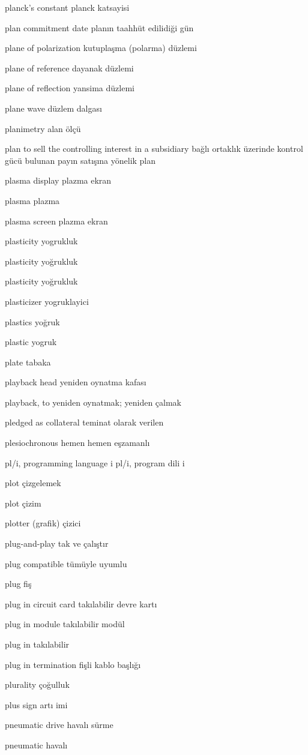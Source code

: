 \documentclass[12pt,fleqn]{article}\usepackage{../../common}
\begin{document}
planck's constant planck katsayisi

plan commitment date planın taahhüt edilidiği gün

plane of polarization kutuplaşma (polarma) düzlemi

plane of reference dayanak düzlemi

plane of reflection yansima düzlemi

plane wave düzlem dalgası

planimetry alan ölçü

plan to sell the controlling interest in a subsidiary bağlı ortaklık üzerinde kontrol gücü bulunan payın satışına yönelik plan

plasma display plazma ekran

plasma plazma

plasma screen plazma ekran

plasticity yogrukluk

plasticity yoğrukluk

plasticity yoğrukluk

plasticizer yogruklayici

plastics yoğruk

plastic yogruk

plate tabaka

playback head yeniden oynatma kafası

playback, to yeniden oynatmak; yeniden çalmak

pledged as collateral teminat olarak verilen

plesiochronous hemen hemen eşzamanlı

pl/i, programming language i pl/i, program dili i

plot çizgelemek

plot çizim

plotter (grafik) çizici

plug-and-play tak ve çalıştır

plug compatible tümüyle uyumlu

plug fiş

plug in circuit card takılabilir devre kartı

plug in module takılabilir modül

plug in takılabilir

plug in termination fişli kablo başlığı

plurality çoğulluk

plus sign artı imi

pneumatic drive havalı sürme

pneumatic havalı
\end{document}
